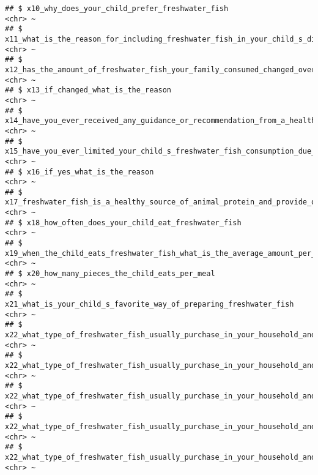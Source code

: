 \documentclass[
]{article}
\begin{document}
\begin{verbatim}
## $ x10_why_does_your_child_prefer_freshwater_fish                                                                                               <chr> ~
## $ x11_what_is_the_reason_for_including_freshwater_fish_in_your_child_s_diet                                                                    <chr> ~
## $ x12_has_the_amount_of_freshwater_fish_your_family_consumed_changed_over_the_last_3_years                                                     <chr> ~
## $ x13_if_changed_what_is_the_reason                                                                                                            <chr> ~
## $ x14_have_you_ever_received_any_guidance_or_recommendation_from_a_healthcare_professional_regarding_freshwater_fish_consumption_of_your_child <chr> ~
## $ x15_have_you_ever_limited_your_child_s_freshwater_fish_consumption_due_to_any_reason                                                         <chr> ~
## $ x16_if_yes_what_is_the_reason                                                                                                                <chr> ~
## $ x17_freshwater_fish_is_a_healthy_source_of_animal_protein_and_provide_other_important_nutrients_for_children                                 <chr> ~
## $ x18_how_often_does_your_child_eat_freshwater_fish                                                                                            <chr> ~
## $ x19_when_the_child_eats_freshwater_fish_what_is_the_average_amount_per_day                                                                   <chr> ~
## $ x20_how_many_pieces_the_child_eats_per_meal                                                                                                  <chr> ~
## $ x21_what_is_your_child_s_favorite_way_of_preparing_freshwater_fish                                                                           <chr> ~
## $ x22_what_type_of_freshwater_fish_usually_purchase_in_your_household_and_how_much_per_month_tilapia                                           <chr> ~
## $ x22_what_type_of_freshwater_fish_usually_purchase_in_your_household_and_how_much_per_month_korali                                            <chr> ~
## $ x22_what_type_of_freshwater_fish_usually_purchase_in_your_household_and_how_much_per_month_hunga                                             <chr> ~
## $ x22_what_type_of_freshwater_fish_usually_purchase_in_your_household_and_how_much_per_month_loolla                                            <chr> ~
## $ x22_what_type_of_freshwater_fish_usually_purchase_in_your_household_and_how_much_per_month_pethiya                                           <chr> ~

\end{verbatim}
\end{document}
